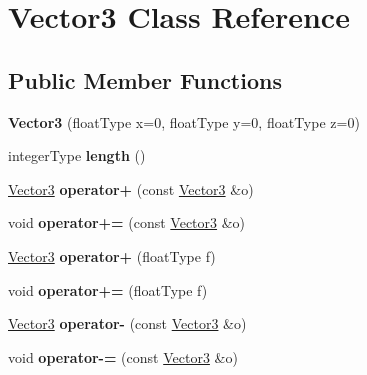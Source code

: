\hypertarget{classVector3}{\section{Vector3 Class Reference}
\label{classVector3}
}
\subsection*{Public Member Functions}
\begin{DoxyCompactItemize}
\item 
\hypertarget{classVector3_aa97bcb6531180b866287040854c8fe39}{{\bfseries Vector3} (float\-Type x=0, float\-Type y=0, float\-Type z=0)}\label{classVector3_aa97bcb6531180b866287040854c8fe39}

\item 
\hypertarget{classVector3_aab01e80276a16441ab8d7fcad839f684}{integer\-Type {\bfseries length} ()}\label{classVector3_aab01e80276a16441ab8d7fcad839f684}

\item 
\hypertarget{classVector3_ac59be6c001391b6a5e54bc2b4f211943}{\hyperlink{classVector3}{Vector3} {\bfseries operator+} (const \hyperlink{classVector3}{Vector3} \&o)}\label{classVector3_ac59be6c001391b6a5e54bc2b4f211943}

\item 
\hypertarget{classVector3_a587056c9995304716f65b04b89361cf1}{void {\bfseries operator+=} (const \hyperlink{classVector3}{Vector3} \&o)}\label{classVector3_a587056c9995304716f65b04b89361cf1}

\item 
\hypertarget{classVector3_a2e8edb96b36fe53774abb9d03c970c35}{\hyperlink{classVector3}{Vector3} {\bfseries operator+} (float\-Type f)}\label{classVector3_a2e8edb96b36fe53774abb9d03c970c35}

\item 
\hypertarget{classVector3_a65fe869407aac486d8c3558f80a75ff6}{void {\bfseries operator+=} (float\-Type f)}\label{classVector3_a65fe869407aac486d8c3558f80a75ff6}

\item 
\hypertarget{classVector3_a80f4bf22dffdd7d8cf8e2817751130e9}{\hyperlink{classVector3}{Vector3} {\bfseries operator-\/} (const \hyperlink{classVector3}{Vector3} \&o)}\label{classVector3_a80f4bf22dffdd7d8cf8e2817751130e9}

\item 
\hypertarget{classVector3_a20edc901faa589045ce9704651b02aa4}{void {\bfseries operator-\/=} (const \hyperlink{classVector3}{Vector3} \&o)}\label{classVector3_a20edc901faa589045ce9704651b02aa4}


\end{DoxyCompactItemize}
